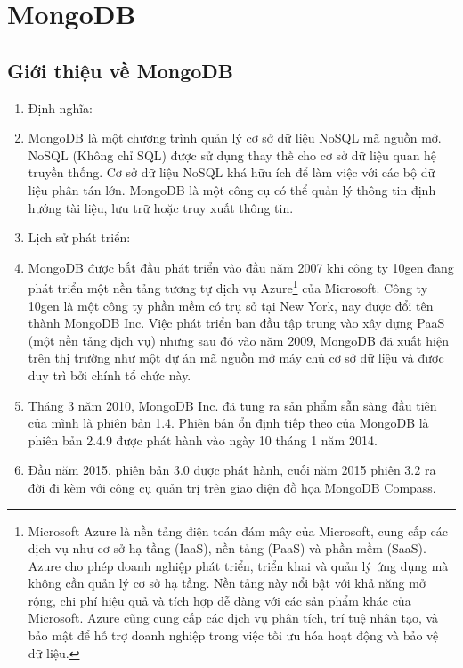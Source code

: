 \section{MongoDB}
\subsection{Giới thiệu về MongoDB}
\begin{enumerate}
    \item Định nghĩa:
    \item []\hspace*{0.7cm} MongoDB là một chương trình quản lý cơ sở dữ liệu NoSQL mã nguồn mở. NoSQL (Không chỉ SQL) được sử dụng thay thế cho cơ sở dữ liệu quan hệ truyền thống. Cơ sở dữ liệu NoSQL khá hữu ích để làm việc với các bộ dữ liệu phân tán lớn. MongoDB là một công cụ có thể quản lý thông tin định hướng tài liệu, lưu trữ hoặc truy xuất thông tin.\cite{noauthor_what_nodate_dn_DB}
    
    \item Lịch sử phát triển:
    \item []\hspace*{0.7cm}MongoDB được bắt đầu phát triển vào đầu năm 2007 khi công ty 10gen đang phát triển một nền tảng tương tự dịch vụ Azure\footnote{Microsoft Azure là nền tảng điện toán đám mây của Microsoft, cung cấp các dịch vụ như cơ sở hạ tầng (IaaS), nền tảng (PaaS) và phần mềm (SaaS). Azure cho phép doanh nghiệp phát triển, triển khai và quản lý ứng dụng mà không cần quản lý cơ sở hạ tầng. Nền tảng này nổi bật với khả năng mở rộng, chi phí hiệu quả và tích hợp dễ dàng với các sản phẩm khác của Microsoft. Azure cũng cung cấp các dịch vụ phân tích, trí tuệ nhân tạo, và bảo mật để hỗ trợ doanh nghiệp trong việc tối ưu hóa hoạt động và bảo vệ dữ liệu.} của Microsoft. Công ty 10gen là một công ty phần mềm có trụ sở tại New York, nay được đổi tên thành MongoDB Inc. Việc phát triển ban đầu tập trung vào xây dựng PaaS (một nền tảng dịch vụ) nhưng sau đó vào năm 2009, MongoDB đã xuất hiện trên thị trường như một dự án mã nguồn mở máy chủ cơ sở dữ liệu và được duy trì bởi chính tổ chức này.\cite{noauthor_mongodb_2023} 
    
    \item []\hspace*{0.7cm}Tháng 3 năm 2010, MongoDB Inc. đã tung ra sản phẩm sẵn sàng đầu tiên của mình là phiên bản 1.4. Phiên bản ổn định tiếp theo của MongoDB là phiên bản 2.4.9 được phát hành vào ngày 10 tháng 1 năm 2014.
    \item []\hspace*{0.7cm}Đầu năm 2015, phiên bản 3.0 được phát hành, cuối năm 2015 phiên 3.2 ra đời đi kèm với công cụ quản trị trên giao diện đồ họa MongoDB Compass.
\end{enumerate}

